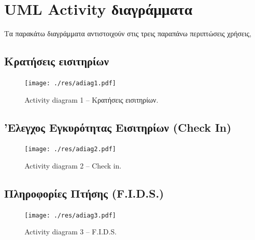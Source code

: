 \documentclass[12pt]{article}
\begin{document}
\pagebreak
\section{UML Activity διαγράμματα}

Τα παρακάτω διαγράμματα αντιστοιχούν στις τρεις παραπάνω περιπτώσεις χρήσεις,

\subsection{Κρατήσεις εισιτηρίων}
\begin{figure}[H]
	\centering
	\texttt{[image: ./res/adiag1.pdf]}
	\caption{Activity diagram 1 -- Κρατήσεις εισιτηρίων.}
\end{figure}

\subsection{'Ελεγχος Εγκυρότητας Εισιτηρίων (Check In)}
\begin{figure}[H]
	\centering
	\texttt{[image: ./res/adiag2.pdf]}
	\caption{Activity diagram 2 -- Check in.}
\end{figure}

\subsection{Πληροφορίες Πτήσης (F.I.D.S.)}
\begin{figure}[H]
	\centering
	\texttt{[image: ./res/adiag3.pdf]}
	\caption{Activity diagram 3 -- F.I.D.S.}
\end{figure}
\end{document}
